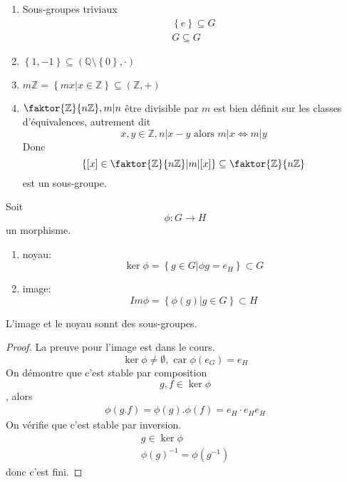 \documentclass[../main.tex]{subfiles}
\begin{document}
\begin{exemple}
\begin{enumerate}
\item Sous-groupes triviaux\\
	\begin{align*}
	\left\{ e   \right\} \subseteq G\\
	G \subseteq G
	\end{align*}

\item $ \left\{ 1,-1 \right\} \subseteq \left( \mathbb{Q}\setminus \left\{ 0 \right\} ,\cdot \right) $

\item $m \mathbb{Z} = \left\{ mx | x \in \mathbb{Z} \right\} \subseteq \left( \mathbb{Z}, + \right)  $ 
\item $\faktor{  \mathbb{Z}  }{ n\mathbb{Z} }, m |n$
	être divisible par $m$ est bien définit sur les classes d'équivalences, autrement dit
	\[ 
	x,y \in \mathbb{Z}, n | x-y \text{ alors } m|x \iff m|y
	\]
	Donc
	\[ 
		\left\{ [ x] \in \faktor{\mathbb{Z}}{n\mathbb{Z}} | m | [ x]  \right\} \subseteq \faktor{\mathbb{Z}}{n\mathbb{Z}}	
	\]
	est un sous-groupe.
	
\end{enumerate}
\end{exemple}
\begin{defn}
Soit 
\[ 
\phi: G \to H
\]
un morphisme.
\begin{enumerate}
\item noyau:
	\[ 
	\ker \phi = \left\{ g \in G | \phi g = e_H \right\}  \subset G
	\]
	
\item image:
	\[ 
		Im \phi = \left\{ \phi( g) |g \in G \right\} \subset H
	\]
	
\end{enumerate}

\end{defn}
\begin{propo}
L'image et le noyau sonnt des sous-groupes.
\end{propo}

\begin{proof}
La preuve pour l'image est dans le cours.\\
\[ 
	\ker \phi \neq \emptyset, \text{ car } \phi( e_G) = e_H
\]
On démontre que c'est stable par composition
\[ 
g,f\in \ker \phi
\]
, alors
\begin{align*}
	\phi( g.f) = \phi( g) .\phi(f) = e_H \cdot e_H e_H
\end{align*}
On vérifie que c'est stable par inversion.
\begin{align*}
g \in \ker \phi\\
\phi( g) ^{-1}= \phi( g^{-1}) 
\end{align*}
donc c'est fini.
\end{proof}

	
\end{document}
